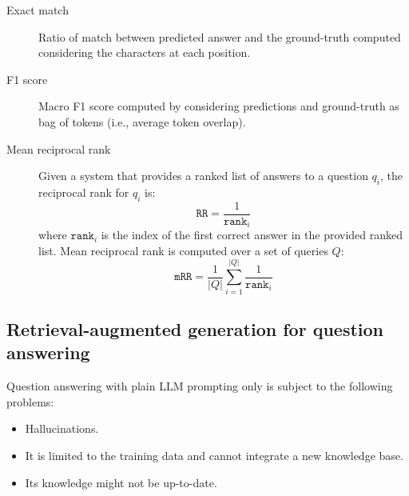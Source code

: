 \begin{description}
    \item[Exact match] 
        Ratio of match between predicted answer and the ground-truth computed considering the characters at each position.

    \item[F1 score] 
        Macro F1 score computed by considering predictions and ground-truth as bag of tokens (i.e., average token overlap).

    \item[Mean reciprocal rank] 
        Given a system that provides a ranked list of answers to a question $q_i$, the reciprocal rank for $q_i$ is:
        \[ \texttt{RR} = \frac{1}{\texttt{rank}_i} \]
        where $\texttt{rank}_i$ is the index of the first correct answer in the provided ranked list.
        Mean reciprocal rank is computed over a set of queries $Q$:
        \[ \texttt{mRR} = \frac{1}{|Q|} \sum_{i=1}^{|Q|} \frac{1}{\texttt{rank}_i} \]

\end{description}


\subsection{Retrieval-augmented generation for question answering}

\begin{remark}
    Question answering with plain LLM prompting only is subject to the following problems:
    \begin{itemize}
        \item Hallucinations.
        \item It is limited to the training data and cannot integrate a new knowledge base.
        \item Its knowledge might not be up-to-date.
    \end{itemize}
\end{remark}

